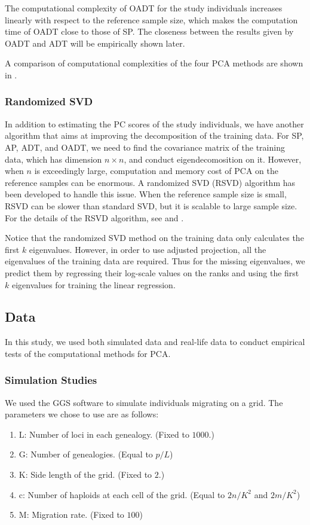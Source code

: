 \documentclass{article}
\begin{document}
The computational complexity of OADT for the study individuals increases linearly with respect to the reference sample size, which makes the computation time of OADT close to those of SP.
The closeness between the results given by OADT and ADT will be empirically shown later.

A comparison of computational complexities of the four PCA methods are shown in .

\subsubsection{Randomized SVD}

In addition to estimating the PC scores of the study individuals,
we have another algorithm that aims at improving the decomposition of the
training data.
For SP, AP, ADT, and OADT, we need to find the covariance matrix of the training
data, which has dimension $n \times n$, and conduct eigendecomosition on it.
However, when $n$ is exceedingly large,
computation and memory cost of PCA on the reference samples can be enormous.
A randomized SVD (RSVD) algorithm has been developed to handle this issue.
When the reference sample size is small, RSVD can be slower than standard SVD,
but it is scalable to large sample size.
For the details of the RSVD algorithm, see \cite{halko} and \cite{abraham}.

Notice that the randomized SVD method on the training data
only calculates the first $k$ eigenvalues.
However, in order to use adjusted projection,
all the eigenvalues of the training data are required.
Thus for the missing eigenvalues,
we predict them by regressing their log-scale values on the ranks
and using the first $k$ eigenvalues for training the linear regression.


\subsection{Data}

In this study, we used both simulated data and real-life data to conduct
empirical tests of the computational methods for PCA.

\subsubsection{Simulation Studies}

We used the GGS software to simulate individuals migrating on a grid.
The parameters we chose to use are as follows:
\begin{enumerate}
\item L: Number of loci in each genealogy. (Fixed to $1000$.)
\item G: Number of genealogies. (Equal to $p / L$)
\item K: Side length of the grid. (Fixed to $2$.)
\item c: Number of haploids at each cell of the grid. (Equal to $2n / K^2$ and
$2m / K^2$)
\item M: Migration rate. (Fixed to $100$)
\end{enumerate}
\end{document}
